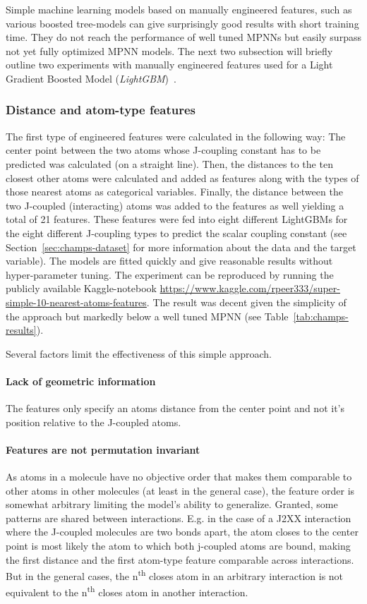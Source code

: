 Simple machine learning models based on manually engineered features, such as various boosted tree-models can give surprisingly good results with short training time. They do not reach the performance of well tuned MPNNs but easily surpass not yet fully optimized MPNN models. The next two subsection will briefly outline two experiments with manually engineered features used for a Light Gradient Boosted Model (\textit{LightGBM})~\cite{Ke2017}.


\subsubsection{Distance and atom-type features}
\label{sec:dist-atom-type}

The first type of engineered features were calculated in the following way: The center point between the two atoms whose J-coupling constant has to be predicted was calculated (on a straight line). Then, the distances to the ten closest other atoms were calculated and added as features along with the types of those nearest atoms as categorical variables. Finally, the distance between the two J-coupled (interacting) atoms was added to the features as well yielding a total of 21 features. These features were fed into eight different LightGBMs
for the eight different J-coupling types to predict the scalar coupling constant (see Section~\ref{sec:champs-dataset} for more information about the data and the target variable). The models are fitted quickly and give reasonable results without hyper-parameter tuning. The experiment can be reproduced by running the publicly available Kaggle-notebook \url{https://www.kaggle.com/rpeer333/super-simple-10-nearest-atoms-features}. The result was decent given the simplicity of the approach but markedly below a well tuned MPNN (see Table~\ref{tab:champs-results}).

Several factors limit the effectiveness of this simple approach.

\paragraph{Lack of geometric information} The features only specify an atoms distance from the center point and not it's position relative to the J-coupled atoms.

\paragraph{Features are not permutation invariant} As atoms in a molecule have no objective order that makes them comparable to other atoms in other molecules (at least in the general case), the feature order is somewhat arbitrary limiting the model's ability to generalize. Granted, some patterns are shared between interactions. E.g. in the case of a J2XX interaction where the J-coupled molecules are two bonds apart, the atom closes to the center point is most likely the atom to which both j-coupled atoms are bound, making the first distance and the first atom-type feature comparable across interactions. But in the general cases, the n\textsuperscript{th} closes atom in an arbitrary interaction is not equivalent to the n\textsuperscript{th} closes atom in another interaction.

